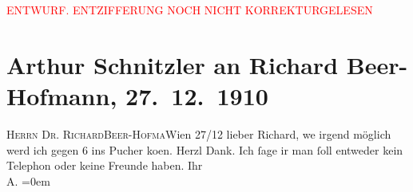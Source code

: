 
\begin{center}
            \textcolor{red}{ENTWURF. ENTZIFFERUNG NOCH NICHT KORREKTURGELESEN}
                      \end{center}
            
               \section[Arthur Schnitzler an Richard Beer-Hofmann, 27. 12. 1910]{ Arthur Schnitzler an Richard Beer-Hofmann, 27. 12. 1910}\nopagebreak{}\rehead{ }\begin{ledgroupsized}[t]{13cm}\normalsize\beginnumbering{} \toendnotes[C]{\smallbreak\pagebreak[2]} 
\pstart{}{\pb}\textsc{Herrn Dr. Richard}\pend{}\pstart{}\textsc{Beer-Hofma{\geminationn}}\pend{}\pstart{}Wien\pend{}{\bigskip}\pstart
           \raggedleft{}{\pb}27/12\pend
           \pstart{}lieber Richard,\pend\pstart
           we{\geminationn} irgend möglich werd ich gegen 6 ins Pucher ko{\geminationm}en. Herzl
               Dank. Ich ſage i{\geminationm}r man ſoll entweder kein Telephon oder
               keine Freunde haben.\pend
           \pstart
           Ihr{\\[\baselineskip]}\spacefill\mbox{A.}\pend
           \leftskip=0em{}\endnumbering{}\end{ledgroupsized}  \newcommand{\dateiname}{L01996}\newcommand{\titel}{Arthur Schnitzler an Richard Beer-Hofmann, 27. 12. 1910}\newcommand{\editorInnen}{Martin Anton Müller und Gerd-Hermann Susen}
      